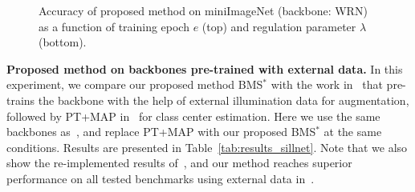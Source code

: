 \documentclass[review]{elsarticle}
\begin{document}
\begin{figure}[h]
\begin{center}
  \end{center}
  \vspace{-.5cm}
  \caption{Accuracy of proposed method on miniImageNet (backbone: WRN) as a function of training epoch $e$ (top) and regulation parameter $\lambda$ (bottom).}
  \label{fig:functionofe}
\end{figure}

\textbf{Proposed method on backbones pre-trained with external data.} In this experiment, we compare our proposed method BMS$^*$ with the work in~\cite{DBLP:journals/corr/abs-2102-03539} that pre-trains the backbone with the help of external illumination data for augmentation, followed by PT+MAP in~\cite{hu2021leveraging} for class center estimation. Here we use the same backbones as~\cite{DBLP:journals/corr/abs-2102-03539}, and replace PT+MAP with our proposed BMS$^*$ at the same conditions. Results are presented in Table~\ref{tab:results_sillnet}. Note that we also show the re-implemented results of~\cite{DBLP:journals/corr/abs-2102-03539}, and our method reaches superior performance on all tested benchmarks using external data in~\cite{DBLP:journals/corr/abs-2102-03539}.
\end{document}
